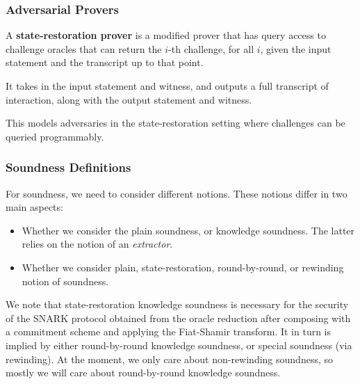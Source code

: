 \subsubsection{Adversarial Provers}


\begin{definition}
    \label{def:sr_prover}
    A \textbf{state-restoration prover} is a modified prover that has query access to challenge oracles that can return the $i$-th challenge, for all $i$, given the input statement and the transcript up to that point.

    It takes in the input statement and witness, and outputs a full transcript of interaction,
    along with the output statement and witness.

    This models adversaries in the state-restoration setting where challenges can be queried programmably.
\end{definition}

\subsubsection{Soundness Definitions}

For soundness, we need to consider different notions. These notions differ in two main aspects:
\begin{itemize}
    \item Whether we consider the plain soundness, or knowledge soundness. The latter relies on the
    notion of an \emph{extractor}.
    \item Whether we consider plain, state-restoration, round-by-round, or rewinding notion of
    soundness.
\end{itemize}

We note that state-restoration knowledge soundness is necessary for the security of the SNARK
protocol obtained from the oracle reduction after composing with a commitment scheme and applying
the Fiat-Shamir transform. It in turn is implied by either round-by-round knowledge soundness, or
special soundness (via rewinding). At the moment, we only care about non-rewinding soundness, so mostly we will care about round-by-round knowledge soundness.

